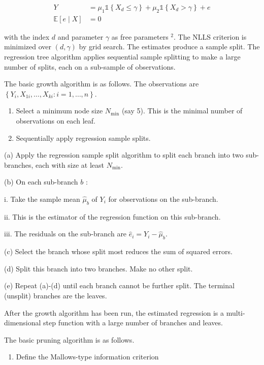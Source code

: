 \documentclass[10pt]{article}
\begin{document}
$$
\begin{aligned}
Y &=\mu_{1} \mathbb{1}\left\{X_{d} \leq \gamma\right\}+\mu_{2} \mathbb{1}\left\{X_{d}>\gamma\right\}+e \\
\mathbb{E}[e \mid X] &=0
\end{aligned}
$$

with the index $d$ and parameter $\gamma$ as free parameters ${ }^{2}$. The NLLS criterion is minimized over $(d, \gamma)$ by grid search. The estimates produce a sample split. The regression tree algorithm applies sequential sample splitting to make a large number of splits, each on a sub-sample of observations.

The basic growth algorithm is as follows. The observations are $\left\{Y_{i}, X_{1 i}, \ldots, X_{k i}: i=1, \ldots, n\right\}$.

\begin{enumerate}
  \item Select a minimum node size $N_{\min }$ (say 5). This is the minimal number of observations on each leaf.

  \item Sequentially apply regression sample splits.

\end{enumerate}

(a) Apply the regression sample split algorithm to split each branch into two sub-branches, each with size at least $N_{\min }$.

(b) On each sub-branch $b$ :

i. Take the sample mean $\widehat{\mu}_{b}$ of $Y_{i}$ for observations on the sub-branch.

ii. This is the estimator of the regression function on this sub-branch.

iii. The residuals on the sub-branch are $\widehat{e}_{i}=Y_{i}-\widehat{\mu}_{b}$.

(c) Select the branch whose split most reduces the sum of squared errors.

(d) Split this branch into two branches. Make no other split.

(e) Repeat (a)-(d) until each branch cannot be further split. The terminal (unsplit) branches are the leaves.

After the growth algorithm has been run, the estimated regression is a multi-dimensional step function with a large number of branches and leaves.

The basic pruning algorithm is as follows.

\begin{enumerate}
  \item Define the Mallows-type information criterion
\end{enumerate}
\end{document}
